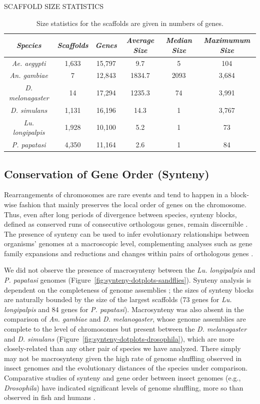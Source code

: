 \begin{table}[H]
  \centering
  \caption{SCAFFOLD SIZE STATISTICS}
  \begin{tabular}{c c c c c c} \hline
    \emph{Species} & \emph{Scaffolds} & \emph{Genes} & \emph{Average Size} & \emph{Median Size} & \emph{Maximumum Size} \\ \hline
    \emph{Ae. aegypti} & 1,633 & 15,797 & 9.7 & 5 & 104 \\
    \emph{An. gambiae} & 7 & 12,843 & 1834.7 & 2093 & 3,684 \\
    \emph{D. melonagaster} & 14 & 17,294 & 1235.3 & 74 & 3,991 \\ 
    \emph{D. simulans} & 1,131 & 16,196 & 14.3 & 1 & 3,767 \\ 
    \emph{Lu. longipalpis} & 1,928 & 10,100 & 5.2 & 1 & 73\\
    \emph{P. papatasi} & 4,350 & 11,164 & 2.6 & 1 & 84
  \end{tabular}
  \caption*{Size statistics for the scaffolds are given in numbers of genes.}
  \label{tab:scaffold-sizes}
\end{table}

\subsection{Conservation of Gene Order (Synteny)}
Rearrangements of chromosomes are rare events and tend to happen in a block-wise fashion that mainly preserves the local order of genes on the chromosome. Thus, even after long periods of divergence between species, synteny blocks, defined as conserved runs of consecutive orthologous genes, remain discernible \cite{Heger2007}.  The presence of synteny can be used to infer evolutionary relationships between organisms' genomes at a macroscopic level, complementing analyses such as gene family expansions and reductions and changes within pairs of orthologous genes \cite{Zdobnov2002,Zdobnov2007}.

We did not observe the presence of macrosynteny between the \emph{Lu. longipalpis} and \emph{P. papatasi} genomes (Figure~\ref{fig:synteny-dotplots-sandflies}).  Synteny analysis is dependent on the completeness of genome assemblies \cite{Heger2007}; the sizes of synteny blocks are naturally bounded by the size of the largest scaffolds (73 genes for \emph{Lu. longipalpis} and 84 genes for \emph{P. papatasi}). Macrosynteny was also absent in the comparison of \emph{An. gambiae} and \emph{D. melanogaster}, whose genome assemblies are complete to the level of chromosomes but present between the \emph{D. melanogaster} and \emph{D. simulans} (Figure~\ref{fig:synteny-dotplots-drosophila}), which are more closely-related than any other pair of species we have analyzed. There simply may not be macrosynteny given the high rate of genome shuffling observed in insect genomes and the evolutionary distances of the species under comparison. Comparative studies of synteny and gene order between insect genomes (e.g., \emph{Drosophila}) have indicated significant levels of genome shuffling, more so than observed in fish and humans \cite{Ranz2001,Zdobnov2002,Zdobnov2007}.

